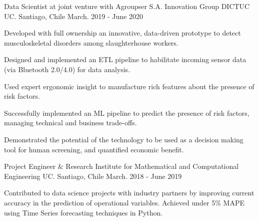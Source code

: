 

\begin{cventries}


\cventry
{Data Scientist at joint venture with Agroupser S.A. Innovation Group} %
{DICTUC UC.} %
{Santiago, Chile} %
{March. 2019 - June 2020} %
{
  \begin{cvitems} %
    \item {Developed with full ownership an innovative, data-driven prototype to detect musculoskeletal disorders among slaughterhouse workers.}
    \item {Designed and implemented an ETL pipeline to habilitate incoming sensor data (via Bluetooth 2.0/4.0) for data analysis.}
    \item {Used expert ergonomic insight to manufacture rich features about the presence of risk factors.}
    \item {Successfully implemented an ML pipeline to predict the presence of risk factors, managing technical and business trade-offs.}
    \item {Demonstrated the potential of the technology to be used as a decision making tool for human screening, and quantified economic benefit.}
  \end{cvitems}
}
\cventry
{Project Engineer \& Research} %
{Institute for Mathematical and Computational Engineering UC.} %
{Santiago, Chile} %
{March. 2018 - June 2019} %
{
  \begin{cvitems} %
    \item {Contributed to data science projects with industry partners by improving current accuracy in
    the prediction of operational variables. Achieved under 5\% MAPE using Time Series forecasting techniques in Python.}
  \end{cvitems}
}



\end{cventries}
